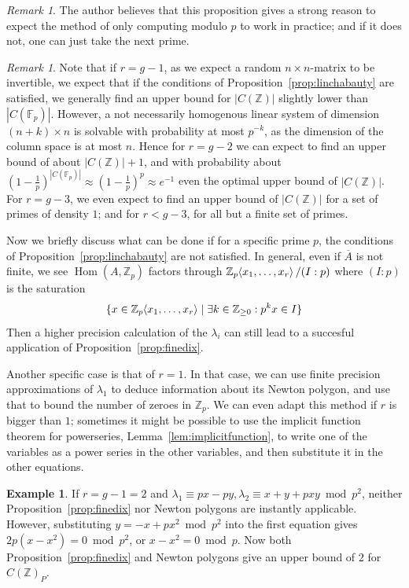 \documentclass[12pt]{article}
\newcommand{\Z}{\mathbb{Z}}
\newcommand{\F}{\mathbb{F}}
\renewcommand{\angle}[1]{\hspace{-2pt}\left\langle #1 \right\rangle}
\DeclareMathOperator{\Hom}{Hom}
\theoremstyle{plain}
\theoremstyle{definition}
\newtheorem{exmp}[thm]{Example} %
\theoremstyle{remark}
\newtheorem{rem}[thm]{Remark} %
\begin{document}
\begin{rem}
The author believes that this proposition gives a strong reason to expect the method of only computing modulo $p$ to work in practice; and if it does not, one can just take the next prime.
\end{rem}
\begin{rem}
Note that if $r=g-1$, as we expect a random $n\times n$-matrix to be invertible, we expect that if the conditions of Proposition~\ref{prop:linchabauty} are satisfied, we generally find an upper bound for $|C(\Z)|$ slightly lower than $|C(\F_p)|$. However, a not necessarily homogenous linear system of dimension $(n+k)\times n$ is solvable with probability at most $p^{-k}$, as the dimension of the column space is at most $n$. Hence for $r = g-2$ we can expect to find an upper bound of about $|C(\Z)|+1$, and with probability about $(1-\frac{1}{p})^{|C(\F_p)|} \approx (1-\frac{1}{p})^p \approx e^{-1}$ even the optimal upper bound of $|C(\Z)|$. For $r = g-3$, we even expect to find an upper bound of $|C(\Z)|$ for a set of primes of density $1$; and for $r < g-3$, for all but a finite set of primes. 
\end{rem}

Now we briefly discuss what can be done if for a specific prime $p$, the conditions of Proposition~\ref{prop:linchabauty} are not satisfied. In general, even if $\overline{A}$ is not finite, we see $\Hom(A,\Z_p)$ factors through $\Z_p\angle{x_1,\dots,x_r}/(I:p)$ where $(I:p)$ is the saturation \[\{x \in \Z_p\angle{x_1,\dots,x_r} \mid \exists k \in \Z_{\geq 0}: p^kx \in I\}\] Then a higher precision calculation of the $\lambda_i$ can still lead to a succesful application of Proposition~\ref{prop:finedix}.

Another specific case is that of $r = 1$. In that case, we can use finite precision approximations of $\lambda_1$ to deduce information about its Newton polygon, and use that to bound the number of zeroes in $\Z_p$. We can even adapt this method if $r$ is bigger than $1$; sometimes it might be possible to use the implicit function theorem for powerseries, Lemma~\ref{lem:implicitfunction}, to write one of the variables as a power series in the other variables, and then substitute it in the other equations.

\begin{exmp}
If $r = g-1 = 2$ and $\lambda_1 \equiv px-py,\lambda_2 \equiv x+y+pxy \bmod p^2$, neither Proposition~\ref{prop:finedix} nor Newton polygons are instantly applicable. However, substituting $y = -x +px^2 \bmod p^2$ into the first equation gives $2p(x-x^2) = 0 \bmod p^2$, or $x-x^2 = 0\bmod p$. Now both Proposition~\ref{prop:finedix} and Newton polygons give an upper bound of $2$ for $C(\Z)_P$.
\end{exmp}
\end{document}
